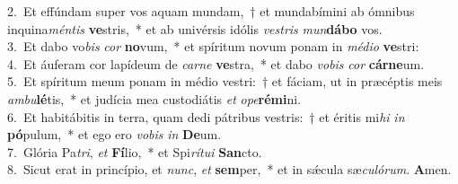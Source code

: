 {2.~}Et effúndam super vos aquam mundam,~† et mundabímini ab ómnibus inquina\textit{mén}\textit{tis} \textbf{ve}stris,~* et ab univérsis idólis \textit{ve}\textit{stris} \textit{mun}\textbf{dá}\textbf{bo} vos.\\
{3.~}Et dabo vo\textit{bis} \textit{cor} \textbf{no}vum,~* et spíritum novum ponam in \textit{mé}\textit{di}\textit{o} \textbf{ve}stri:\\
{4.~}Et áuferam cor lapídeum de \textit{car}\textit{ne} \textbf{ve}stra,~* et dabo \textit{vo}\textit{bis} \textit{cor} \textbf{cár}\textbf{ne}um.\\
{5.~}Et spíritum meum ponam in médio vestri:~† et fáciam, ut in præcéptis meis \textit{am}\textit{bu}\textbf{lé}tis,~* et judícia mea custodiátis \textit{et} \textit{o}\textit{pe}\textbf{ré}\textbf{mi}ni.\\
{6.~}Et habitábitis in terra, quam dedi pátribus vestris:~† et éritis mi\textit{hi} \textit{in} \textbf{pó}pulum,~* et ego ero \textit{vo}\textit{bis} \textit{in} \textbf{De}um.\\
{7.~}Glória Pa\textit{tri}, \textit{et} \textbf{Fí}lio,~* et Spi\textit{rí}\textit{tu}\textit{i} \textbf{San}cto.\\
{8.~}Sicut erat in princípio, et \textit{nunc}, \textit{et} \textbf{sem}per,~* et in sǽcula sæ\textit{cu}\textit{ló}\textit{rum}. \textbf{A}men.\\
